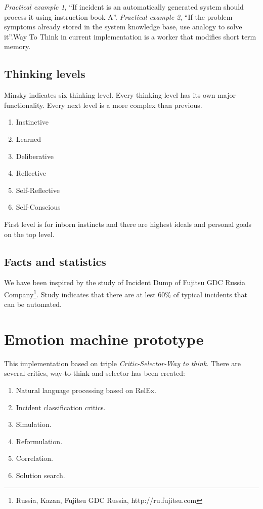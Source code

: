 \documentclass[runningheads,a4paper]{llncs}
\begin{document}
\begin{enumerate}
\emph{Practical example 1}, “If incident is an automatically generated system should process it using instruction book A”.
\emph{Practical example 2}, “If the problem symptoms already stored in the system knowledge base, use analogy to solve it”.Way To Think in current implementation is a worker that modifies short term memory.

\subsection{Thinking levels}

Minsky indicates six thinking level. Every thinking level has its own major functionality. Every next level is a more complex than previous.

\begin{enumerate}
 \item Instinctive
 \item Learned
 \item Deliberative
 \item Reflective
 \item Self-Reflective
 \item Self-Conscious
\end{enumerate}
First level is for inborn instincts and there are highest ideals and personal goals on the top level.

\subsection{Facts and statistics}
We have been inspired by the study of Incident Dump of Fujitsu GDC Russia  Company\footnote{Russia, Kazan, Fujitsu GDC Russia, http://ru.fujitsu.com}. Study indicates that there are at lest 60\% of typical incidents that can be automated.

\section{Emotion machine prototype}
This implementation based on triple \emph{Critic-Selector-Way to think}. There are several critics, way-to-think and selector has been created:

\begin{enumerate}
 \item Natural language processing based on RelEx.
 \item Incident classification critics.
 \item Simulation.
 \item Reformulation.
 \item Correlation.
 \item Solution search.
\end{enumerate}


\end{enumerate}
\end{document}
